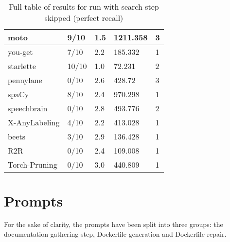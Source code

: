 \documentclass[conference]{IEEEtran}
\begin{document}
\begin{table}[!h]
\begin{tabular}{|l|l|l|l|l|}
        moto & 9/10 & 1.5 & 1211.358 & 3 \\ \hline
        you-get & 7/10 & 2.2 & 185.332 & 1 \\ \hline
        starlette & 10/10 & 1.0 & 72.231 & 2 \\ \hline
        pennylane & 0/10 & 2.6 & 428.72 & 3 \\ \hline
        spaCy & 8/10 & 2.4 & 970.298 & 1 \\ \hline
        speechbrain & 0/10 & 2.8 & 493.776 & 2 \\ \hline
        X-AnyLabeling & 4/10 & 2.2 & 413.028 & 1 \\ \hline
        beets & 3/10 & 2.9 & 136.428 & 1 \\ \hline
        R2R & 0/10 & 2.4 & 109.008 & 1 \\ \hline
        Torch-Pruning & 0/10 & 3.0 & 440.809 & 1 \\ \hline
    \end{tabular}
    \caption{Full table of results for run with search step skipped (perfect recall)}
    \label{tab:results}
\end{table}

\newpage

\section{Prompts}
For the sake of clarity, the prompts have been split into three groups: the documentation gathering step, Dockerfile generation and Dockerfile repair.
\end{document}
